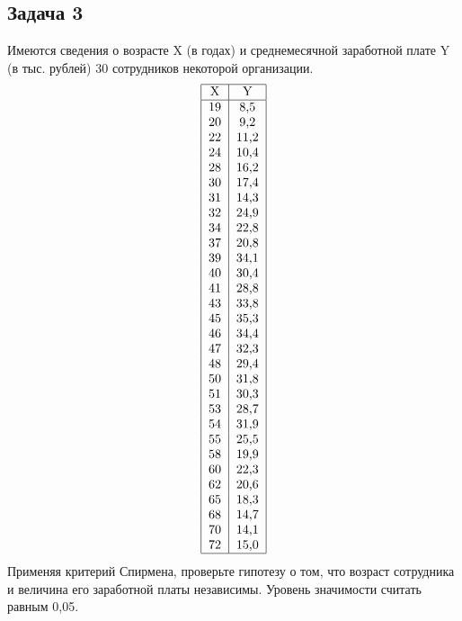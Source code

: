 \documentclass[12pt, a4paper]{article}
\begin{document}
\subsection*{Задача 3}
Имеются сведения о возрасте X (в годах) и среднемесячной заработной плате Y (в тыс. рублей) 30 сотрудников некоторой организации.
\[\begin{tabular}{|c|c|}
  \hline
  X & Y \\
  \hline
  19 & 8,5 \\
  20 & 9,2 \\
  22 & 11,2 \\
  24 & 10,4 \\
  28 & 16,2 \\
  30 & 17,4 \\
  31 & 14,3 \\
  32 & 24,9 \\
  34 & 22,8 \\
  37 & 20,8 \\
  39 & 34,1 \\
  40 & 30,4 \\
  41 & 28,8 \\
  43 & 33,8 \\
  45 & 35,3 \\
  46 & 34,4 \\
  47 & 32,3 \\
  48 & 29,4 \\
  50 & 31,8 \\
  51 & 30,3 \\
  53 & 28,7 \\
  54 & 31,9 \\
  55 & 25,5 \\
  58 & 19,9 \\
  60 & 22,3 \\
  62 & 20,6 \\
  65 & 18,3 \\
  68 & 14,7 \\
  70 & 14,1 \\
  72 & 15,0 \\
  \hline
\end{tabular}\]
Применяя критерий Спирмена, проверьте гипотезу о том, что возраст сотрудника и величина его заработной платы независимы. Уровень значимости считать равным 0,05.
\end{document}
